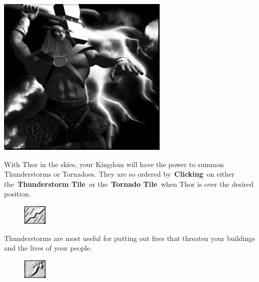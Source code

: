 \begin{center}
	\includegraphics[width=.9\linewidth]{Athor}
\end{center}

With Thor in the skies, your Kingdom will have the power to summon Thunderstorms or Tornadoes. They are so ordered by \textbf{Clicking} on either the \textbf{Thunderstorm Tile} or the \textbf{Tornado Tile} when Thor is over the desired position.

\begin{figure}
	\vspace{-20pt}
	\begin{center}
		\includegraphics[width=0.1\textwidth]{Train}
	\end{center}
	\vspace{-20pt}
\end{figure}

Thunderstorms are most useful for putting out fires that threaten your buildings and the lives of your people. \\

\begin{figure}
	\vspace{-20pt}
	\begin{center}
		\includegraphics[width=0.1\textwidth]{Ttornedo}
	\end{center}
	\vspace{-20pt}
\end{figure}

